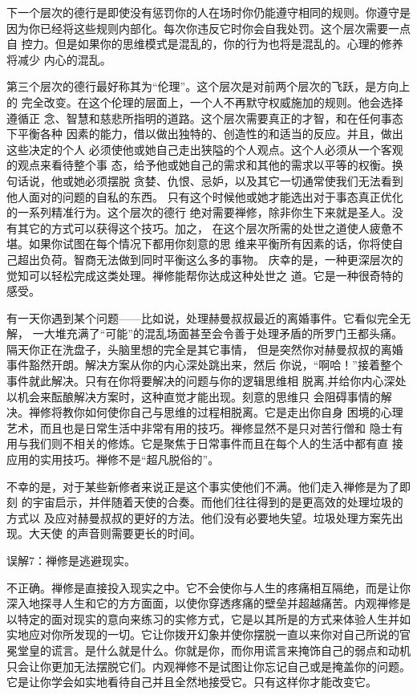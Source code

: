 下一个层次的德行是即使\1没有惩罚你的人在场时你仍能遵守相同的规则。你遵守是
因为你已经将这些规则内部化。每次你违反它时你会自我处罚。这个层次需要一点自
控力。但是如果你的思维模式是混乱的，你的行为也将是混乱的。心理的修养将减少
内心的混乱。

第三个层次的德行最好称其为“伦理”。这个层次是对前两个层次的飞跃，是方向上的
完全改变。在这个伦理的层面上，一个人不再默守权威施加的规则。他会选择遵循正
念、智慧和慈悲所指明的道路。这个层次需要真正的才智，和在任何事态下平衡各种
因素的能力，借以做出独特的、创造性的和适当的反应。并且，做出这些决定的个人
必须使他或她自己走出狭隘的个人观点。这个人必须从一个客观的观点来看待整个事
态，给予他或她自己的需求和其他的需求以平等的权衡。换句话说，他或她必须摆脱
贪婪、仇恨、忌妒，以及其它一切通常使我们无法看到他人面对的问题的自私的东西。
只有这个时候他或她才能选出对于事态真正优化的一系列精准行为。这个层次的德行
绝对需要禅修，除非你生下来就是圣人。没有其它的方式可以获得这个技巧。加之，
在这个层次所需的处世之道使人疲惫不堪。如果你试图在每个情况下都用你刻意的思
维来平衡所有因素的话，你将使自己超出负荷。智商无法做到同时平衡这么多的事物。
庆幸的是，一种更深层次的觉知可以轻松完成这类处理。禅修能帮你达成这种处世之
道。它是一种很奇特的感受。

有一天你遇到某个问题——比如说，处理赫曼叔叔最近的离婚事件。它看似完全无解，
一大堆充满了“可能”的混乱场面\1甚至会令善于处理矛盾的所罗门王都头痛。隔天你正在洗盘子，头脑里想的完全是其它事情，
但是突然你对赫曼叔叔的离婚事件豁然开朗。解决方案从你的内心深处跳出来，然后
你说，“啊哈！”接着整个事件就此解决。只有在你将要解决的问题与你的逻辑思维相
脱离,并给你内心深处以机会来酝酿解决方案时，这种直觉才能出现。刻意的思维只
会阻碍事情的解决。禅修将教你如何使你自己与思维的过程相脱离。它是走出你自身
困境的心理艺术，而且也是日常生活中非常有用的技巧。禅修显然不是只对苦行僧和
隐士有用与我们则不相关的修炼。它是聚焦于日常事件而且在每个人的生活中都有直
接应用的实用技巧。禅修不是“超凡脱俗的”。

不幸的是，对于某些新修者来说正是这个事实使他们不满。他们走入禅修是为了即刻
的宇宙启示，并伴随着天使的合奏。而他们往往得到的是更高效的处理垃圾的方式以
及应对赫曼叔叔的更好的方法。他们没有必要地失望。垃圾处理方案先出现。大天使
的声音则需要更长的时间。

\subsectnon 误解7：禅修是逃避现实。

不正确。禅修是直接投入现实之中。它不会使你与人生的疼痛相互隔绝，而是让你
深入地探寻人生和它的方方面面，以使你穿透疼痛的壁垒并超越痛苦。内观禅修是
以特定的面对现实的意向来练习的实修方式，它是以其所是的方式来体验人生并如
实地应对你所发现的一切。它让你拨开幻象并使你摆脱一直以来你对自己所说的官
冕堂皇的谎言。是什么就是什么。你就是你，而你用谎言来掩饰自己的\1弱点和动机
只会让你更加无法摆脱它们。内观禅修不是试图让你忘记自己或是掩盖你的问题。
它是让你学会如实地看待自己并且全然地接受它。只有这样你才能改变它。

